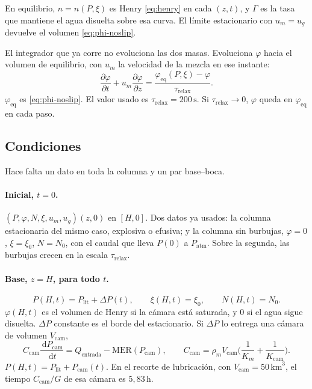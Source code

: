 \documentclass[11pt,a4paper]{article}
\newcommand{\dd}{\,\mathrm{d}}
\newcommand{\p}{\partial}
\begin{document}
En equilibrio, $n=n(P,\xi)$ es Henry \eqref{eq:henry} en cada
$(z,t)$, y $\Gamma$ es la tasa que mantiene el agua disuelta sobre
esa curva. El límite estacionario con $u_m=u_g$ devuelve el volumen
\eqref{eq:phi-noslip}.

El integrador que ya corre no evoluciona las dos masas. Evoluciona
$\varphi$ hacia el volumen de equilibrio, con $u_m$ la velocidad de
la mezcla en ese instante:
\begin{equation}
\label{eq:relax}
\frac{\p\varphi}{\p t}+u_m\frac{\p\varphi}{\p z}
=\frac{\varphi_{\mathrm{eq}}(P,\xi)-\varphi}{\tau_{\mathrm{relax}}}.
\end{equation}
$\varphi_{\mathrm{eq}}$ es \eqref{eq:phi-noslip}. El valor usado es
$\tau_{\mathrm{relax}}=200\,\mathrm{s}$. Si
$\tau_{\mathrm{relax}}\to 0$, $\varphi$ queda en
$\varphi_{\mathrm{eq}}$ en cada paso.

\subsection{Condiciones}

Hace falta un dato en toda la columna y un par base--boca.

\paragraph{Inicial, $t=0$.}
$(P,\varphi,N,\xi,u_m,u_g)(z,0)$ en $[H,0]$. Dos datos ya usados:
la columna estacionaria del mismo caso, explosiva o efusiva; y la
columna sin burbujas, $\varphi=0$, $\xi=\xi_0$, $N=N_0$, con el
caudal que lleva $P(0)$ a $P_{\mathrm{atm}}$. Sobre la segunda, las
burbujas crecen en la escala $\tau_{\mathrm{relax}}$.

\paragraph{Base, $z=H$, para todo $t$.}
\begin{equation}
\label{eq:base-t}
P(H,t)=P_{\mathrm{lit}}+\Delta P(t),
\qquad
\xi(H,t)=\xi_0,
\qquad
N(H,t)=N_0.
\end{equation}
$\varphi(H,t)$ es el volumen de Henry si la cámara está saturada, y
$0$ si el agua sigue disuelta. $\Delta P$ constante es el borde del
estacionario. Si $\Delta P$ lo entrega una cámara de volumen
$V_{\mathrm{cam}}$,
\begin{equation}
\label{eq:camara}
C_{\mathrm{cam}}\frac{\dd P_{\mathrm{cam}}}{\dd t}
=Q_{\mathrm{entrada}}-\mathrm{MER}(P_{\mathrm{cam}}),
\qquad
C_{\mathrm{cam}}
=\rho_m V_{\mathrm{cam}}\Biggl(\frac{1}{K_m}+\frac{1}{K_{\mathrm{cam}}}\Biggr).
\end{equation}
$P(H,t)=P_{\mathrm{lit}}+P_{\mathrm{cam}}(t)$. En el recorte de
lubricación, con $V_{\mathrm{cam}}=50\,\mathrm{km}^3$, el tiempo
$C_{\mathrm{cam}}/G$ de esa cámara es $5{,}83\,\mathrm{h}$.
\end{document}
